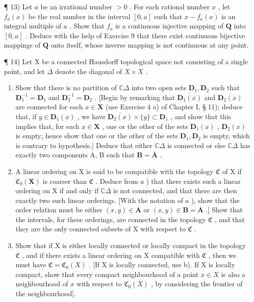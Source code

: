 ¶ 13) Let \(a\) be an irrational number \(>0\) . For each rational number \(x\) , let \(f_{a}(x)\) be the real number in the interval \([0, a]\) such that \(x - f_{a}(x)\) is an integral multiple of \(a\) . Show that \(f_{a}\) is a continuous injective mapping of \(\mathbf{Q}\) into \([0, a]\) . Deduce with the help of Exercise 9 that there exist continuous bijective mappings of \(\mathbf{Q}\) onto itself, whose inverse mapping is not continuous at any point.

¶ 14) Let X be a connected Hausdorff topological space not consisting of a single point, and let \(\Delta\) denote the diagonal of \(X \times X\) .

\begin{enumerate}
\def\labelenumi{\alph{enumi})}
\item
  Show that there is no partition of \(\mathbb{C}\Delta\) into two open sets \(\mathbf{D}_1, \mathbf{D}_2\) such that \(\mathbf{D}_1^{-1} = \mathbf{D}_1\) and \(\mathbf{D}_2^{-1} = \mathbf{D}_2\) . {[}Begin by remarking that \(\overline{\mathbf{D}_1(x)}\) and \(\overline{\mathbf{D}_2(x)}\) are connected for each \(x \in \mathbf{X}\) (use Exercise 4 a) of Chapter I, § 11); deduce that, if \(y \in \mathbf{D}_1(x)\) , we have \(\overline{\mathbf{D}_2(x)} \times \{y\} \subset \mathbf{D}_1\) , and show that this implies that, for each \(x \in \mathbf{X}\) , one or the other of the sets \(\mathbf{D}_1(x)\) , \(\mathbf{D}_2(x)\) is empty; hence show that one or the other of the sets \(\mathbf{D}_1, \mathbf{D}_2\) is empty, which is contrary to hypothesis.{]} Deduce that either \(\mathbb{C}\Delta\) is connected or else \(\mathbb{C}\Delta\) has exactly two components A, B such that \(\mathbf{B} = \overline{\mathbf{A}}\) .
\item
  A linear ordering on X is said to be compatible with the topology \(\mathfrak{C}\) of X if \(\mathfrak{C}_0(\mathbf{X})\) is coarser than \(\mathfrak{C}\) . Deduce from \(a\) ) that there exists such a linear ordering on X if and only if \(\mathbb{C}\Delta\) is not connected, and that there are then exactly two such linear orderings. {[}With the notation of \(a\) ), show that the order relation must be either \((x, y) \in \mathbf{A}\) or \((x, y) \in \mathbf{B} = \overline{\mathbf{A}}\) .{]} Show that the intervals, for these orderings, are connected in the topology \(\mathfrak{C}\) , and that they are the only connected subsets of X with respect to \(\mathfrak{C}\) .
\item
  Show that if X is either locally connected or locally compact in the topology \(\mathfrak{C}\) , and if there exists a linear ordering on X compatible with \(\mathfrak{C}\) , then we must have \(\mathfrak{C} = \mathfrak{C}_0(X)\) . {[}If X is locally connected, use b). If X is locally compact, show that every compact neighbourhood of a point \(x \in X\) is also a neighbourhood of \(x\) with respect to \(\mathfrak{C}_0(X)\) , by considering the frontier of the neighbourhood{]}.
\end{enumerate}

